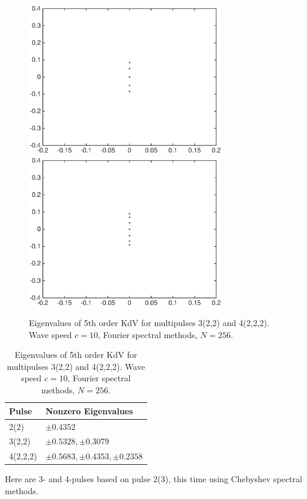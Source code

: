 \documentclass[12pt]{article}
\begin{document}
\begin{figure}[H]
	\includegraphics[width=8.5cm]{four10um1_3lambda}
	\includegraphics[width=8.5cm]{four10um1_4lambda}
	\caption{Eigenvalues of 5th order KdV for multipulses 3(2,2) and 4(2,2,2). Wave speed $c = 10$, Fourier spectral methods, $N = 256$. }
\end{figure}

\begin{table}[H]
\begin{tabular}{l|l}
  Pulse    &  Nonzero Eigenvalues \\ \hline
  2(2)     &     $\pm 0.4352$  \\ 
  3(2,2)   &     $\pm 0.5328, \pm 0.3079$   \\ 
  4(2,2,2) &     $\pm 0.5683, \pm 0.4353, \pm 0.2358 $  \\ 
\end{tabular}
\caption{Eigenvalues of 5th order KdV for multipulses 3(2,2) and 4(2,2,2). Wave speed $c = 10$, Fourier spectral methods, $N = 256$. }
\end{table}

 Here are 3- and 4-pulses based on pulse 2(3), this time using Chebyshev spectral methods.
\end{document}
